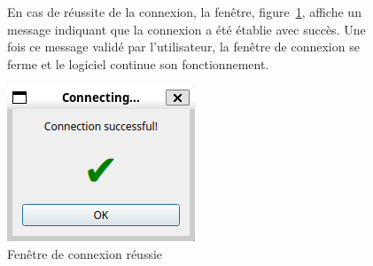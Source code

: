 \begin{figure}[H]
    \begin{minipage}{0.64\textwidth}
        En cas de réussite de la connexion, la fenêtre, figure~\ref{fig:connecting success}, affiche un message indiquant que la connexion a été établie avec succès.
        Une fois ce message validé par l'utilisateur, la fenêtre de connexion se ferme et le logiciel continue son fonctionnement.
    \end{minipage}\hfill
    \begin{minipage}{0.30\textwidth}
        \centering
        \includegraphics[width=\textwidth]{assets/figures/ConnectingSuccess.png}
        \caption{Fenêtre de connexion réussie}
        \label{fig:connecting success}
    \end{minipage}
\end{figure}

